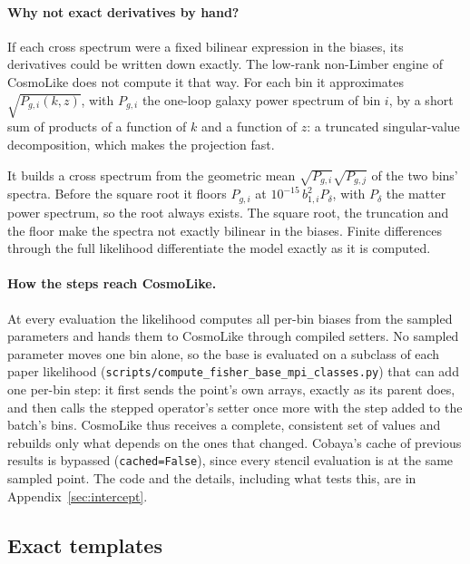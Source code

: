 \documentclass[11pt]{article}
\newcommand{\us}{\_\allowbreak}
\begin{document}
\paragraph{Why not exact derivatives by hand?}
If each cross spectrum were a fixed bilinear expression in the biases,
its derivatives could be written down exactly.  The low-rank
non-Limber engine of CosmoLike does not compute it that way.  For each
bin it approximates $\sqrt{P_{g,i}(k, z)}$, with $P_{g,i}$ the one-loop
galaxy power spectrum of bin $i$, by a short sum of products of a
function of $k$ and a function of $z$: a truncated singular-value
decomposition, which makes the projection fast.

It builds a cross spectrum from the geometric mean
$\sqrt{P_{g,i}}\sqrt{P_{g,j}}$ of the two bins' spectra.  Before the
square root it floors $P_{g,i}$ at $10^{-15}\,b_{1,i}^2 P_\delta$, with
$P_\delta$ the matter power spectrum, so the root always exists.  The
square root, the truncation and the floor make the spectra not exactly
bilinear in the biases.  Finite differences through the full likelihood
differentiate the model exactly as it is computed.

\paragraph{How the steps reach CosmoLike.}
At every evaluation the likelihood computes all per-bin biases from
the sampled parameters and hands them to CosmoLike through compiled
setters.  No sampled parameter moves one bin alone, so the base is
evaluated on a subclass of each paper likelihood
(\texttt{scripts/compute\us fisher\us base\us mpi\us classes.py})
that can add one per-bin step: it first sends the point's own arrays,
exactly as its parent does, and then calls the stepped operator's
setter once more with the step added to the batch's bins.  CosmoLike
thus receives a complete, consistent set of values and rebuilds only
what depends on the ones that changed.  Cobaya's cache of previous
results is bypassed (\texttt{cached=False}), since every stencil
evaluation is at the same sampled point.  The code and the details,
including what tests this, are in Appendix~\ref{sec:intercept}.


\subsection{Exact templates}
\label{sec:templates}
\end{document}
